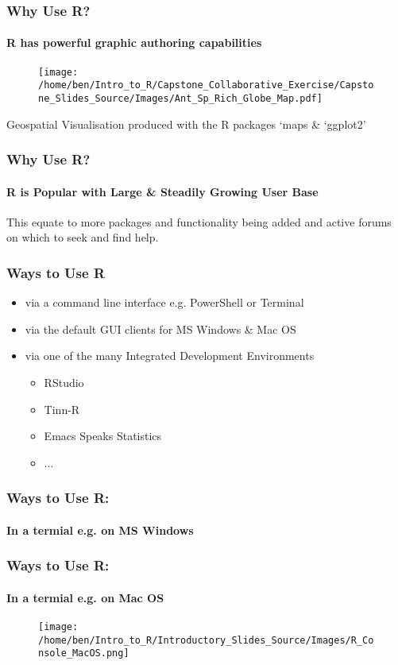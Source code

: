 \documentclass[xcolor=dvipsnames]{beamer}
\begin{document}
\begin{frame} 
\frametitle{Why Use R?}
\framesubtitle{R has powerful graphic authoring capabilities}

\begin{figure}
\texttt{[image: /home/ben/Intro\_to\_R/Capstone\_Collaborative\_Exercise/Capstone\_Slides\_Source/Images/Ant\_Sp\_Rich\_Globe\_Map.pdf]}
\end{figure}

\tiny Geospatial Visualisation produced with the R packages `maps \& `ggplot2'

\end{frame}

\begin{frame} 
\frametitle{Why Use R?}
\framesubtitle{R is Popular with Large \& Steadily Growing User Base}
This equate to more packages and functionality being added and active forums on which to seek and find help.

\end{frame}

\begin{frame} 
\frametitle{Ways to Use R}
\begin{itemize}
\item via a command line interface e.g. PowerShell or Terminal
\item via the default GUI clients for MS Windows \& Mac OS
\item via one of the many Integrated Development Environments \begin{itemize}
 \item RStudio
 \item Tinn-R
 \item Emacs Speaks Statistics
 \item ...
 \end{itemize}
\end{itemize}
\end{frame}

\begin{frame}
\frametitle{Ways to Use R:}
\framesubtitle{In a termial e.g. on MS Windows}
\end{frame}

\begin{frame}
\frametitle{Ways to Use R:}
\framesubtitle{In a termial e.g. on Mac OS}
\begin{figure}
\texttt{[image: /home/ben/Intro\_to\_R/Introductory\_Slides\_Source/Images/R\_Console\_MacOS.png]}
\end{figure}
\end{frame}
\end{document}
